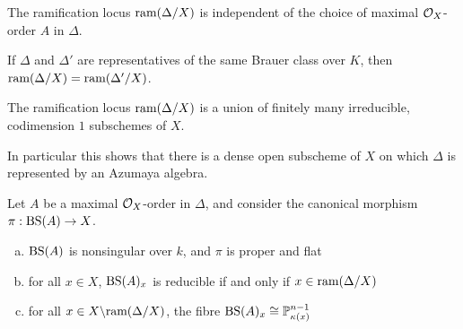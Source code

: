 \begin{lem}
The ramification locus $\textnormal{ram}(\Delta/X)$ is independent of the choice of maximal $\mathcal{O}_X$-order $A$ in $\Delta$.
\end{lem}

\begin{prop}
If $\Delta$ and $\Delta'$ are representatives of the same Brauer class over $K$, then $\textnormal{ram}(\Delta/X) = \textnormal{ram}(\Delta'/X)$.
\end{prop}

\begin{prop}
The ramification locus $\textnormal{ram}(\Delta/X)$ is a union of finitely many irreducible, codimension $1$ subschemes of $X$.
\end{prop}
In particular this shows that there is a dense open subscheme of $X$ on which $\Delta$ is represented by an Azumaya algebra.

\begin{prop}
Let $A$ be a maximal $\mathcal{O}_X$-order in $\Delta$, and consider the canonical morphism $\pi: \textnormal{BS}(A)\rightarrow X$.
\begin{enumerate}[(a)]
\item  $\textnormal{BS}(A)$ is nonsingular over $k$, and $\pi$ is proper and flat
\item  for all $x\in X$, $\textnormal{BS}(A)_x$ is reducible if and only if $x\in \textnormal{ram}(\Delta/X)$
\item  for all $x\in X\backslash \textnormal{ram}(\Delta/X)$, the fibre $\textnormal{BS}(A)_x \cong \mathbb{P}^{n-1}_{\kappa(x)}$
\end{enumerate}
\end{prop}

